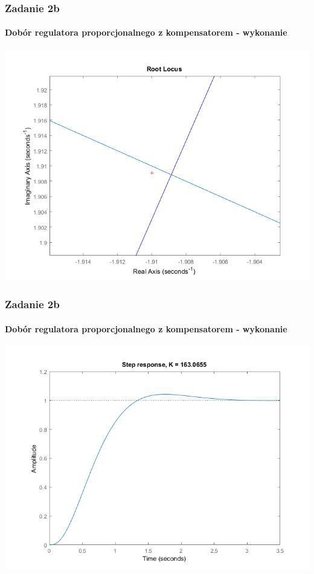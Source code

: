 \documentclass{beamer}
\begin{document}
\begin{frame}\frametitle{Zadanie 2b}\framesubtitle{Dobór regulatora proporcjonalnego z kompensatorem - wykonanie}
\centering	\includegraphics[scale=0.5]{b-rlocfind.png}
\end{frame}

\begin{frame}\frametitle{Zadanie 2b}\framesubtitle{Dobór regulatora proporcjonalnego z kompensatorem - wykonanie}
\centering	\includegraphics[scale=0.5]{b-sys-zamk-k.png}
\end{frame}
\end{document}
